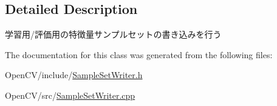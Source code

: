 \subsection{Detailed Description}
学習用/評価用の特徴量サンプルセットの書き込みを行う 

The documentation for this class was generated from the following files\+:\begin{DoxyCompactItemize}
\item 
Open\+C\+V/include/\hyperlink{_sample_set_writer_8h}{Sample\+Set\+Writer.\+h}\item 
Open\+C\+V/src/\hyperlink{_sample_set_writer_8cpp}{Sample\+Set\+Writer.\+cpp}\end{DoxyCompactItemize}
